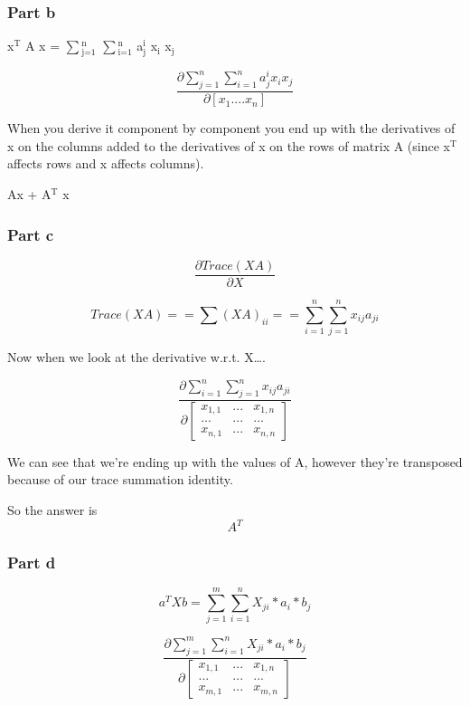 \documentclass[11pt]{article}
\begin{document}
\subsubsection{Part b}
\label{sec-6-1-2}

x$^{\text{T}}$ A x = $\sum$$_{\text{j=1}}^{\text{n}}$ $\sum$$_{\text{i=1}}^{\text{n}}$ a$_{\text{j}}^{\text{i}}$ x$_{\text{i}}$ x$_{\text{j}}$

$$ \dfrac{ \partial \sum_{j=1}^{n} \sum_{i=1}^{n} a_j^i x_i x_j }{ \partial [x_1 .... x_n] }$$

When you derive it component by component you end up with the derivatives of x on the columns added to the derivatives of x on the rows of matrix A (since x$^{\text{T}}$ affects rows and x affects columns).

Ax + A$^{\text{T}}$ x

\subsubsection{Part c}
\label{sec-6-1-3}
$$ \dfrac{ \partial Trace(XA)}{ \partial X} $$

$$ Trace(XA) == \sum (XA)_{ii} == \sum_{i=1}^{n} \sum_{j=1}^{n} x_{ij} a_{ji} $$

Now when we look at the derivative w.r.t. X\ldots{}.

$$ \dfrac{\partial \sum_{i=1}^{n} \sum_{j=1}^{n} x_{ij} a_{ji}}{ \partial \begin{bmatrix}
x_{1,1} &...  & x_{1,n} \\
... & ...  & ...\\
x_{n,1} & ... & x_{n,n}
\end{bmatrix} } $$

We can see that we're ending up with the values of A, however they're transposed because of our trace summation identity.

So the answer is $$A^T$$

\subsubsection{Part d}
\label{sec-6-1-4}

$$ a^T X b = \sum_{j=1}^{m} \sum_{i=1}^{n} X_{ji} * a_{i} * b_{j} $$

$$ \dfrac{ \partial \sum_{j=1}^{m} \sum_{i=1}^{n} X_{ji} * a_{i} * b_{j}}{ \partial \begin{bmatrix}
x_{1,1} &...  & x_{1,n} \\
... & ...  & ...\\
x_{m,1} & ... & x_{m,n}
\end{bmatrix} } $$
\end{document}
